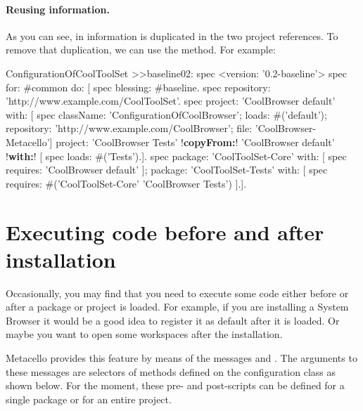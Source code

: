 \documentclass[a4paper,10pt,twoside]{book}
\begin{document}
\paragraph{Reusing information.}
As you can see, in  information is duplicated in the two project references. To remove that duplication, we can use the  method.  For example:

\begin{code}{}
ConfigurationOfCoolToolSet >>baseline02: spec 
       <version: '0.2-baseline'>
       spec for: #common do: [
              spec blessing: #baseline.
              spec repository: 'http://www.example.com/CoolToolSet'.
              spec project: 'CoolBrowser default' with: [
                            spec
                                   className: 'ConfigurationOfCoolBrowser';
                                   loads: #('default');
                                   repository: 'http://www.example.com/CoolBrowser';
                                   file: 'CoolBrowser-Metacello']
                     project: 'CoolBrowser Tests' 
                            !\textbf{copyFrom:}! 'CoolBrowser default' 
                            !\textbf{with:}! [ spec loads: #('Tests').].
              spec 
                     package: 'CoolToolSet-Core' with: [ spec requires: 'CoolBrowser default' ];
                     package: 'CoolToolSet-Tests' with: [ 
                            spec requires: #('CoolToolSet-Core' 'CoolBrowser Tests') ].].                                   
\end{code}



\section{Executing code before and after installation}
Occasionally, you may find that you need to execute some code either before or after a package or project is loaded. For example, if you are installing a System Browser it would be a good idea to register it as default after it is loaded. Or maybe you want to open some workspaces after the installation. 

Metacello provides this feature by means of the messages  and .  The arguments to these messages are selectors of methods defined on the configuration class as shown below. For the moment, these pre- and post-scripts can be defined for a single package or for an entire project. 
\end{document}
